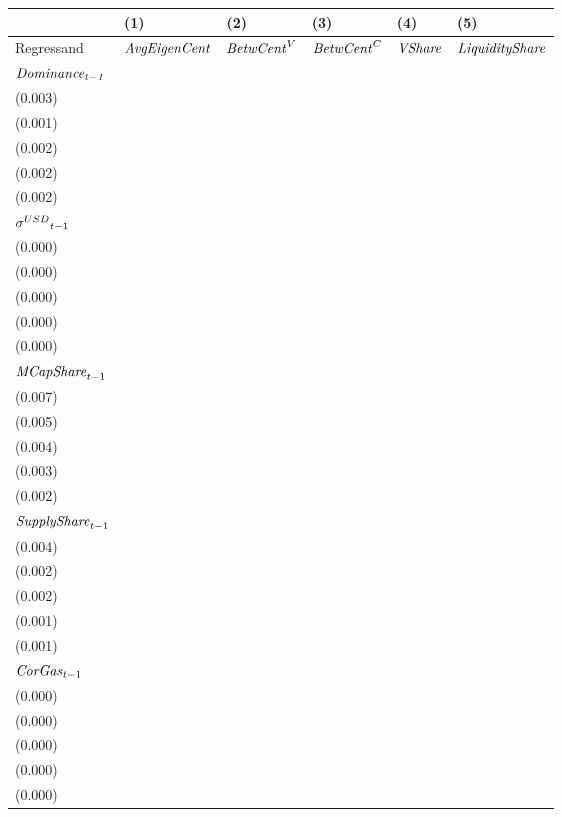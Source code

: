 \begin{tabular}{llllll}
\toprule
{} &                                  (1) &                                  (2) &                                   (3) &                                  (4) &                                   (5) \\
\midrule
Regressand                   &                 ${\it AvgEigenCent}$ &                   ${\it BetwCent}^V$ &                    ${\it BetwCent}^C$ &                       ${\it VShare}$ &                ${\it LiquidityShare}$ \\
$\it Dominance_{t-1}$        &  \makecell{$0.806^{***}$ \\ (0.003)} &  \makecell{$0.957^{***}$ \\ (0.001)} &   \makecell{$0.943^{***}$ \\ (0.002)} &  \makecell{$0.895^{***}$ \\ (0.002)} &   \makecell{$0.956^{***}$ \\ (0.002)} \\
${{\it \sigma}^{USD}}_{t-1}$ &    \makecell{$-0.000^{}$ \\ (0.000)} &    \makecell{$-0.000^{}$ \\ (0.000)} &      \makecell{$0.000^{}$ \\ (0.000)} &    \makecell{$-0.000^{}$ \\ (0.000)} &     \makecell{$-0.000^{}$ \\ (0.000)} \\
${{\it MCapShare}}_{t-1}$    &    \makecell{$-0.002^{}$ \\ (0.007)} &  \makecell{$0.046^{***}$ \\ (0.005)} &   \makecell{$0.054^{***}$ \\ (0.004)} &  \makecell{$0.037^{***}$ \\ (0.003)} &   \makecell{$0.023^{***}$ \\ (0.002)} \\
${{\it SupplyShare}}_{t-1}$  &  \makecell{$0.055^{***}$ \\ (0.004)} &  \makecell{$-0.004^{**}$ \\ (0.002)} &  \makecell{$-0.012^{***}$ \\ (0.002)} &  \makecell{$0.014^{***}$ \\ (0.001)} &  \makecell{$-0.013^{***}$ \\ (0.001)} \\
${{\it CorGas}}_{t-1}$       &    \makecell{$-0.000^{}$ \\ (0.000)} &    \makecell{$-0.000^{}$ \\ (0.000)} &      \makecell{$0.000^{}$ \\ (0.000)} &    \makecell{$-0.000^{}$ \\ (0.000)} &     \makecell{$-0.000^{}$ \\ (0.000)} \\

\end{tabular}
